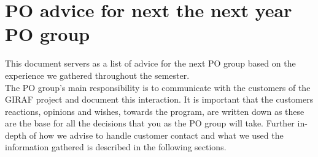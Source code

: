 \section{PO advice for next the next year PO group} \label{appendix:PO-advise}

This document servers as a list of advice for the next PO group based on the experience we gathered throughout the semester.
\\
The PO group's main responsibility is to communicate with the customers of the GIRAF project and document this interaction.
It is important that the customers reactions, opinions and wishes, towards the program, are written down as these are the base for all the decisions that you as the PO group will take.
Further in-depth of how we advise to handle customer contact and what we used the information gathered is described in the following sections.

